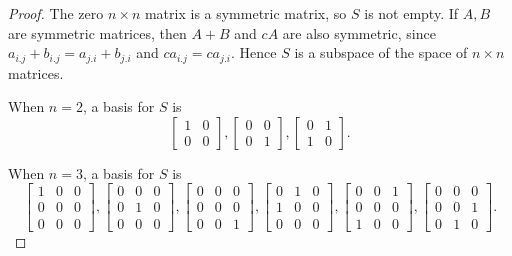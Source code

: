 \begin{proof}
    The zero $n\times n$ matrix is a symmetric matrix, so $S$ is not empty. If $A, B$ are symmetric matrices, then $A + B$ and $cA$ are also symmetric, since $a_{i.j} + b_{i.j} = a_{j.i} + b_{j.i}$ and $ca_{i.j} = ca_{j.i}$. Hence $S$ is a subspace of the space of $n\times n$ matrices.

    When $n = 2$, a basis for $S$ is
    \[
        \begin{bmatrix}
            1 & 0 \\
            0 & 0
        \end{bmatrix},
        \begin{bmatrix}
            0 & 0 \\
            0 & 1
        \end{bmatrix},
        \begin{bmatrix}
            0 & 1 \\
            1 & 0
        \end{bmatrix}.
    \]

    When $n = 3$, a basis for $S$ is
    \[
        \begin{bmatrix}
            1 & 0 & 0 \\
            0 & 0 & 0 \\
            0 & 0 & 0
        \end{bmatrix},
        \begin{bmatrix}
            0 & 0 & 0 \\
            0 & 1 & 0 \\
            0 & 0 & 0
        \end{bmatrix},
        \begin{bmatrix}
            0 & 0 & 0 \\
            0 & 0 & 0 \\
            0 & 0 & 1
        \end{bmatrix},
        \begin{bmatrix}
            0 & 1 & 0 \\
            1 & 0 & 0 \\
            0 & 0 & 0
        \end{bmatrix},
        \begin{bmatrix}
            0 & 0 & 1 \\
            0 & 0 & 0 \\
            1 & 0 & 0
        \end{bmatrix},
        \begin{bmatrix}
            0 & 0 & 0 \\
            0 & 0 & 1 \\
            0 & 1 & 0
        \end{bmatrix}.
    \]
\end{proof}


